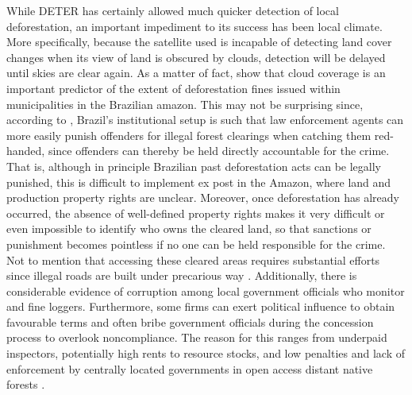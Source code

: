 While DETER has certainly allowed much quicker detection of local deforestation, an important impediment to its success has been local climate.  More specifically, because the satellite used is incapable of detecting land cover changes when its view of land is obscured by clouds, detection will be delayed until skies are clear again.  As a matter of fact, \cite{ASSUNCAO_2017} show that cloud coverage is an important predictor of the extent of deforestation fines issued within municipalities in the Brazilian amazon.  This may not be surprising since, according to \citet{VALERIANO, ASSUNCAO_2017}, Brazil's institutional setup is such that law enforcement agents can more easily punish offenders for illegal forest clearings when catching them red-handed, since offenders can thereby be held directly accountable for the crime. That is, although in principle Brazilian past deforestation acts can be legally punished, this is difficult to implement ex post in the Amazon, where land and production property rights are unclear. Moreover, once deforestation has already occurred, the absence of well-defined property rights makes it very difficult or even impossible to identify who owns the cleared land, so that sanctions or punishment becomes pointless if no one can be held responsible for the crime. Not to mention that accessing these cleared areas requires substantial efforts since illegal roads are built under precarious way \citep{PFAFF3}. Additionally, there is considerable evidence of corruption among local government officials who monitor and fine loggers. Furthermore, some firms can exert political influence to obtain favourable terms and often bribe government officials during the concession process to overlook noncompliance. The reason for this ranges from underpaid inspectors, potentially high rents to resource stocks, and low penalties and lack of enforcement by centrally located governments in open access distant native forests \citep{amacher_2012}.

